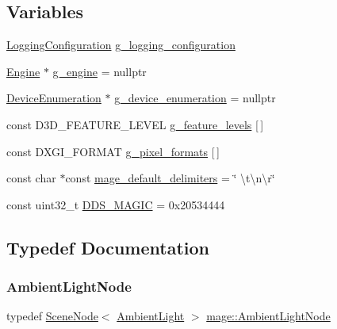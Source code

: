 \subsection*{Variables}
\begin{DoxyCompactItemize}
\item 
\hyperlink{structmage_1_1_logging_configuration}{Logging\+Configuration} \hyperlink{namespacemage_a162413669f92d91c7ee135d60f93fcf1}{g\+\_\+logging\+\_\+configuration}
\item 
\hyperlink{classmage_1_1_engine}{Engine} $\ast$ \hyperlink{namespacemage_a84bf83f1e8779d884452cdf08f56c19a}{g\+\_\+engine} = nullptr
\item 
\hyperlink{classmage_1_1_device_enumeration}{Device\+Enumeration} $\ast$ \hyperlink{namespacemage_a73e54b9b368875ed0281ced59e2fca7e}{g\+\_\+device\+\_\+enumeration} = nullptr
\item 
const D3\+D\+\_\+\+F\+E\+A\+T\+U\+R\+E\+\_\+\+L\+E\+V\+EL \hyperlink{namespacemage_add3b7e051df553262371e077d9d66fd9}{g\+\_\+feature\+\_\+levels} \mbox{[}$\,$\mbox{]}
\item 
const D\+X\+G\+I\+\_\+\+F\+O\+R\+M\+AT \hyperlink{namespacemage_a5a4e11b65061c618b85826ab6df480e0}{g\+\_\+pixel\+\_\+formats} \mbox{[}$\,$\mbox{]}
\item 
const char $\ast$const \hyperlink{namespacemage_ae247ad66af37a4b0d67ddca9404ca01a}{mage\+\_\+default\+\_\+delimiters} = \char`\"{} \textbackslash{}t\textbackslash{}n\textbackslash{}r\char`\"{}
\item 
const uint32\+\_\+t \hyperlink{namespacemage_a52f784e41b51fee843891c6b5e9be479}{D\+D\+S\+\_\+\+M\+A\+G\+IC} = 0x20534444
\end{DoxyCompactItemize}


\subsection{Typedef Documentation}
\hypertarget{namespacemage_a282fb14928fdd9bf45e8f3fdd2dc6c5d}{}\label{namespacemage_a282fb14928fdd9bf45e8f3fdd2dc6c5d} 
\subsubsection{\texorpdfstring{Ambient\+Light\+Node}{AmbientLightNode}}
{\footnotesize\ttfamily typedef \hyperlink{classmage_1_1_scene_node}{Scene\+Node}$<$ \hyperlink{classmage_1_1_ambient_light}{Ambient\+Light} $>$ \hyperlink{namespacemage_a282fb14928fdd9bf45e8f3fdd2dc6c5d}{mage\+::\+Ambient\+Light\+Node}}

